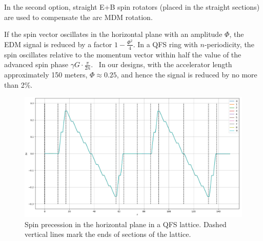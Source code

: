 \documentclass{article}
\begin{document}
In the second option, straight E+B spin rotators (placed in the straight sections) are used to compensate the arc MDM rotation. 

If the spin vector oscillates in the horizontal plane with an amplitude $\Phi$, the EDM signal is reduced by a factor $1 - \frac{\Phi^2}{4}$. In a QFS ring with $n$-periodicity, the spin oscillates relative to the momentum vector within half the value of the advanced spin phase $\gamma G \cdot \frac{\pi}{2n}$.~\cite{Senichev:Shanghai} In our designs, with the accelerator length approximately 150 meters, $\Phi\approx 0.25$, and hence the signal is reduced by no more than 2\%.

\begin{figure}[h]
  \centering
  \includegraphics[width=\textwidth]{img/EB_QFS_Sx_vs_s_1turn}
  \caption{Spin precession in the horizontal plane in a QFS lattice. Dashed vertical lines mark the ends of sections of the lattice.\label{fig:QFS_Sx_vs_s}}
\end{figure}
\end{document}
